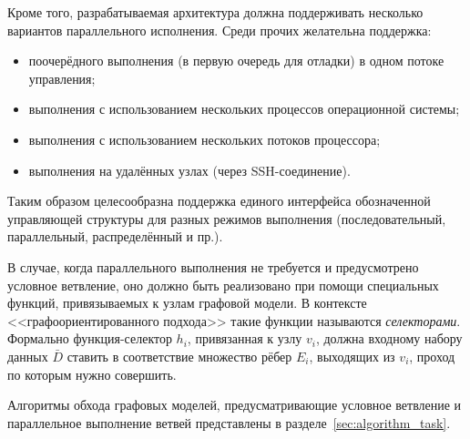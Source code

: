 Кроме того, разрабатываемая архитектура должна поддерживать несколько вариантов параллельного исполнения. Среди прочих желательна поддержка:
\begin{itemize}
    \item поочерёдного выполнения (в первую очередь для отладки) в одном потоке управления;
    \item выполнения с использованием нескольких процессов операционной системы;
    \item выполнения с использованием нескольких потоков процессора;
    \item выполнения на удалённых узлах (через SSH-соединение).
\end{itemize}

Таким образом целесообразна поддержка единого интерфейса обозначенной управляющей структуры для разных режимов выполнения (последовательный, параллельный, распределённый и пр.).

В случае, когда параллельного выполнения не требуется и предусмотрено условное ветвление, оно должно быть реализовано при помощи специальных функций, привязываемых к узлам графовой модели. В контексте <<графоориентированного подхода>> такие функции называются \emph{селекторами}. Формально функция-селектор $h_i$, привязанная к узлу $v_i$, должна входному набору данных $\bar{D}$ ставить в соответствие множество рёбер $E_i$, выходящих из $v_i$, проход по которым нужно совершить.

Алгоритмы обхода графовых моделей, предусматривающие условное ветвление и параллельное выполнение ветвей представлены в разделе~\ref{sec:algorithm_task}.
